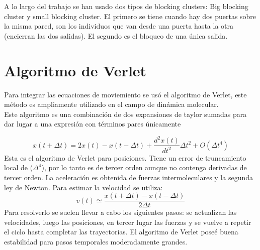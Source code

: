 A lo largo del trabajo se han usado dos tipos de blocking clusters: Big blocking cluster y small blocking cluster. El primero se tiene cuando hay dos puertas sobre la misma pared, son los individuos que van desde una puerta hasta la otra (encierran las dos salidas). El segundo es el bloqueo de una única salida. 

\section{Algoritmo de Verlet}

Para integrar las ecuaciones de moviemiento se usó el algoritmo de Verlet, este método es ampliamente utilizado en el campo de dinámica molecular.\\
Este algoritmo es una combinación de dos expansiones de taylor sumadas para dar lugar a una expresión con términos pares únicamente~\cite{haile}

\begin{equation}
x(t+\Delta t)=2x(t)-x(t-\Delta t)+\frac{d^2x(t)}{dt^2} \Delta t^2+O(\Delta t^4)
\label{verlet_x}
\end{equation} 
Esta es el algoritmo de Verlet para posiciones. Tiene un error de truncamiento local de ($\Delta^4$), por lo tanto es de tercer orden aunque no contenga derivadas de tercer orden. La aceleración es obtenida de fuerzas intermoleculares y la segunda ley de Newton.
Para estimar la velocidad se utiliza:
\begin{equation}
v(t)\simeq \frac{x(t+\Delta t)-x(t-\Delta t)}{2\Delta t}
\label{verlet_v}
\end{equation}
Para resolverlo se suelen llevar a cabo los siguientes pasos: se actualizan las velocidades, luego las posiciones, en tercer lugar las fuerzas y se vuelve a repetir el ciclo hasta completar las trayectorias. 
El algoritmo de Verlet poseé buena estabilidad para pasos temporales moderadamente grandes.

